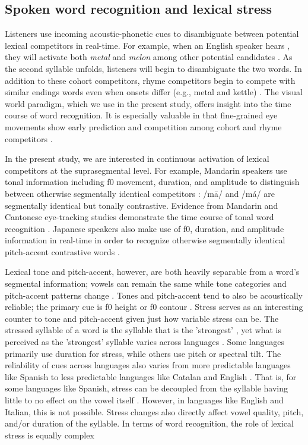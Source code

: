 \subsection{Spoken word recognition and lexical stress}

Listeners use incoming acoustic-phonetic cues to disambiguate between potential lexical competitors in real-time. For example, when an English speaker hears , they will activate both \textit{metal} and \textit{melon} among other potential candidates \citep{Marslen1980}. As the second syllable unfolds, listeners will begin to disambiguate the two words. In addition to these cohort competitors, rhyme competitors begin to compete with similar endings words even when onsets differ (e.g., metal and kettle) \citep{Allopenna_1998}. The visual world paradigm, which we use in the present study, offers insight into the time course of word recognition. It is especially valuable in that fine-grained eye movements show early prediction and competition among cohort and rhyme competitors \citep{Allopenna_1998}.

In the present study, we are interested in continuous activation of lexical competitors at the suprasegmental level. For example, Mandarin speakers use tonal information including f0 movement, duration, and amplitude to distinguish between otherwise segmentally identical competitors \citep{Lee2008, Zhang2022, fox_1985}: /m\=a/ and /m\'a/ are segmentally identical but tonally contrastive. Evidence from Mandarin and Cantonese eye-tracking studies demonstrate the time course of tonal word recognition \citep{zou_2022, qin_2022, Nixon2016}. Japanese speakers also make use of f0, duration, and amplitude information in real-time in order to recognize otherwise segmentally identical pitch-accent contrastive words \citep{goss_2014, Cutler1999, Ito2024}.

Lexical tone and pitch-accent, however, are both heavily separable from a word's segmental information; vowels can remain the same while tone categories and pitch-accent patterns change \citep{Zeng2017}. Tones and pitch-accent tend to also be acoustically reliable; the primary cue is f0 height or f0 contour \citep{goss_2014}.  Stress serves as an interesting counter to tone and pitch-accent given just how variable stress can be. The stressed syllable of a word is the syllable that is the 'strongest' \citep{sluijter1996spectral}, yet what is perceived as the 'strongest' syllable varies across languages \citep{Cutler1988}. Some languages primarily use duration for stress, while others use pitch or spectral tilt. The reliability of cues across languages also varies from more predictable languages like Spanish to less predictable languages like Catalan and English \citep{ortega_2011, beckman_1994}. That is, for some languages like Spanish, stress can be decoupled from the syllable having little to no effect on the vowel itself \citep{ortega_2011}. However, in languages like English and Italian, this is not possible. Stress changes also directly affect vowel quality, pitch, and/or duration of the syllable. In terms of word recognition, the role of lexical stress is equally complex \citep{cutler2001voornaam, Reinisch2010}

